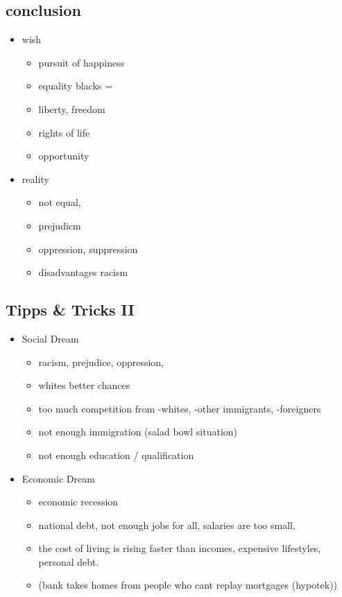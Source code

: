 \documentclass[a5paper,12pt,twoside,titlepage]{scrartcl}
\begin{document}
	\subsection{conclusion}
	\begin{itemize}
		\item wish
		\begin{itemize}
			\item pursuit of happiness
			\item equality \textrightarrow blacks =\frownie
			\item liberty, freedom
			\item rights of life
			\item opportunity 	
		\end{itemize}
		\item reality
		\begin{itemize}
			\item not equal, 
			\item prejudicm
			\item oppression, suppression
			\item disadvantages \textrightarrow racism
		\end{itemize}
	\end{itemize}
	\subsection{Tipps \& Tricks II}
		\begin{itemize}
			\item Social Dream
			\begin{itemize}
				\item racism, prejudice, oppression, 
				\item whites \textrightarrow better chances
				\item too much competition from -whites, -other immigrants, -foreigners
				\item not enough immigration (salad bowl situation)
				\item not enough education / qualification
			\end{itemize}
			\item Economic Dream
			\begin{itemize}
				\item economic recession
				\item national debt, not enough jobs for all, salaries are too small, 
				\item the cost of living is rising faster than incomes, expensive lifestyles, \textrightarrow personal debt.
				\item (bank takes homes from people who cant replay mortgages (hypotek))
			\end{itemize}

		\end{itemize}
	
\end{document}
